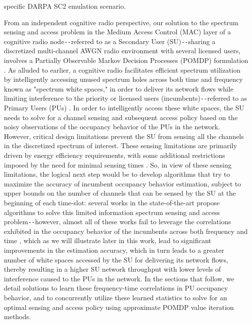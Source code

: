 \documentclass[12pt, draftcls, onecolumn]{IEEEtran}
\begin{document}
specific DARPA SC2 emulation scenario.

From an independent cognitive radio perspective, our solution to the spectrum sensing and access problem in the Medium Access Control (MAC) layer of a cognitive radio node\texttt{-{}-}referred to as a Secondary User (SU)\texttt{-{}-}sharing a discretized multi-channel AWGN radio environment with several licensed users, involves a Partially Observable Markov Decision Processes (POMDP) formulation . As alluded to earlier, a cognitive radio facilitates efficient spectrum utilization by intelligently accessing unused spectrum holes across both time and frequency known as "spectrum white spaces," in order to deliver its network flows while limiting interference to the priority or licensed users (incumbents)\texttt{-{}-}referred to as Primary Users (PUs) \cite{WCL:2}. In order to intelligently access these white spaces, the SU needs to solve for a channel sensing and subsequent access policy based on the noisy observations of the occupancy behavior of the PUs in the network. However, critical design limitations prevent the SU from sensing all the channels in the discretized spectrum of interest. These sensing limitations are primarily driven by energy efficiency requirements, with some additional restrictions imposed by the need for minimal sensing times \cite{WCL:3}. So, in view of these sensing limitations, the logical next step would be to develop algorithms that try to maximize the accuracy of incumbent occupancy behavior estimation, subject to upper bounds on the number of channels that can be sensed by the SU at the beginning of each time-slot: several works in the state-of-the-art \cite{WCL:4,WCL:5,WCL:6,WCL:7} propose algorithms to solve this limited information spectrum sensing and access problem\texttt{-{}-}however, almost all of these works \cite{WCL:4,WCL:5,WCL:8,WCL:9,WCL:10,WCL:11} fail to leverage the correlations exhibited in the occupancy behavior of the incumbents across both frequency and time \cite{WCL:12}, which as we will illustrate later in this work, lead to significant improvements in the estimation accuracy, which in turn leads to a greater number of white spaces accessed by the SU for delivering its network flows, thereby resulting in a higher SU network throughput with lower levels of interference caused to the PUs in the network. In the sections that follow, we detail solutions to learn these frequency-time correlations in PU occupancy behavior, and to concurrently utilize these learned statistics to solve for an optimal sensing and access policy using approximate POMDP value iteration methods.
\end{document}
